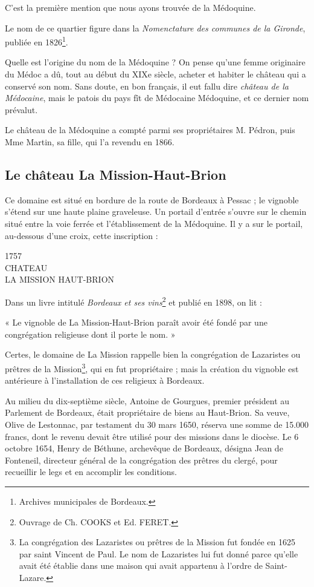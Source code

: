 C'est la première mention que nous ayons trouvée de la Médoquine.

Le nom de ce quartier figure dans la \textit{Nomenctature des communes de la Gironde}, publiée en 1826\footnote{Archives municipales de Bordeaux.}.

Quelle est l'origine du nom de la Médoquine ? On pense qu'une femme originaire du Médoc a dû, tout au début du XIXe siècle, acheter et habiter le château qui a conservé son nom. Sans doute, en bon français, il eut fallu dire \textit{château de la Médocaine}, mais le patois du pays fît de Médocaine Médoquine, et ce dernier nom prévalut.

Le château de la Médoquine a compté parmi ses propriétaires M. Pédron, puis Mme Martin, sa fille, qui l'a revendu en 1866.

\subsection{Le château La Mission-Haut-Brion}

Ce domaine est situé en bordure de la route de Bordeaux à Pessac ; le vignoble s'étend sur une haute plaine graveleuse. Un portail d'entrée s'ouvre sur le chemin situé entre la voie ferrée et l'établissement de la Médoquine. Il y a sur le portail, au-dessous d'une croix, cette inscription :

\begin{center}
1757\\
CHATEAU\\
LA MISSION HAUT-BRION
\end{center}

Dans un livre intitulé \textit{Bordeaux et ses vins}\footnote{Ouvrage de Ch. COOKS et Ed. FERET.} et publié en 1898, on lit :

« Le vignoble de La Mission-Haut-Brion paraît avoir été fondé par une congrégation religieuse dont il porte le nom. »

Certes, le domaine de La Mission rappelle bien la congrégation de Lazaristes ou prêtres de la Mission\footnote{La congrégation des Lazaristes ou prêtres de la Mission fut fondée en 1625 par saint Vincent de Paul. Le nom de Lazaristes lui fut donné parce qu'elle avait été établie dans une maison qui avait appartenu à l'ordre de Saint-Lazare. }, qui en fut propriétaire ; mais la création du vignoble est antérieure à l'installation de ces religieux à Bordeaux.

Au milieu du dix-septième siècle, Antoine de Gourgues, premier président au Parlement de Bordeaux, était propriétaire de biens au Haut-Brion. Sa veuve, Olive de Lestonnac, par testament du 30 mars 1650, réserva une somme de 15.000 francs, dont le revenu devait être utilisé pour des missions dans le diocèse. Le 6 octobre 1654, Henry de Béthune, archevêque de Bordeaux, désigna Jean de Fonteneil, directeur général de la congrégation des prêtres du clergé, pour recueillir le legs et en accomplir les conditions.

